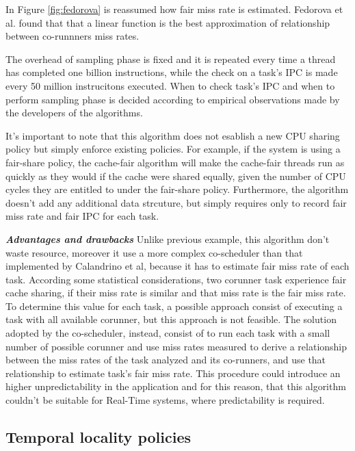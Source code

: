 \begin{description}
In Figure \ref{fig:fedorova} is reassumed how fair miss rate is estimated. Fedorova et al. found that that a linear function is the best approximation of 
relationship between co-runnners miss rates.

The overhead of sampling phase is fixed and it is repeated every time a thread has completed one billion instructions, while the check on a task's IPC
is made every 50 million instrucitons executed. When to check task's IPC and when to perform sampling phase is decided according to empirical observations
made by the developers of the algorithms.

It's important to note that this algorithm does not esablish a new CPU sharing policy but simply enforce existing policies. For example, if the 
system is using a fair-share policy, the cache-fair algorithm will make the cache-fair threads run as quickly as they would if the cache were shared 
equally, given the number of CPU cycles they are entitled to under the fair-share policy. Furthermore, the algorithm doesn't add any additional data 
strcuture, but simply requires only to record fair miss rate and fair IPC for each task.

\textbf{\textit{Advantages and drawbacks}}
Unlike previous example, this algorithm don't waste resource, moreover it use a more complex co-scheduler than that implemented by Calandrino et al, 
because it has to estimate fair miss rate of each task. According some statistical considerations, two corunner task experience fair cache sharing, if 
their miss rate is similar and that miss rate is the fair miss rate. To determine this value for each task, a possible approach consist of executing a task 
with all available corunner, but this approach is not feasible. The solution adopted by the co-scheduler, instead, consist of to run each task with a small 
number of possible corunner and use miss rates measured to derive a relationship between the miss rates of the task analyzed and its co-runners, and use 
that relationship to estimate task's fair miss rate. This procedure could introduce an higher unpredictability in the application and for this reason, that 
this algorithm couldn't be suitable for Real-Time systems, where predictability is required.

\end{description}

\subsection{Temporal locality policies} 

